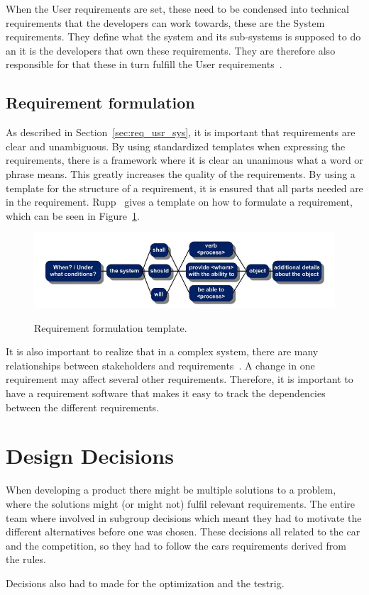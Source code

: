 When the User requirements are set, these need to be condensed into technical
requirements that the developers can work towards, these are the System
requirements. They define what the system and its sub-systems is supposed to do
an it is the developers that own these requirements. They are therefore also
responsible for that these in turn fulfill the User requirements~\cite{ibm_req}.

\subsection{Requirement formulation}
As described in Section~\ref{sec:req_usr_sys}, it is important that requirements
are clear and unambiguous. By using standardized templates when expressing the
requirements, there is a framework where it is clear an unanimous what a word or
phrase means.  This greatly increases the quality of the
requirements\cite{rupp2014}.  By using a template for the structure of a
requirement, it is ensured that all parts needed are in the requirement.
Rupp~\cite{rupp2014} gives a template on how to formulate a
requirement, which can be seen in Figure~\ref{fig:req_template}.
\begin{figure}[H]
    \centering\label{fig:req_template}
    \includegraphics[width=\textwidth]{./img/introduction_req_template.PNG}
    \caption{Requirement formulation template.}
\end{figure}
It is also important to realize that in a complex system, there are many
relationships between stakeholders and requirements~\cite{ibm_req}. A change in
one requirement may affect several other requirements. Therefore, it is
important to have a requirement software that makes it easy to track the
dependencies between the different requirements.


\section{Design Decisions}
When developing a product there might be multiple solutions to a problem, 
where the solutions might (or might not) fulfil relevant requirements. 
The entire team where involved in subgroup decisions which meant they had to motivate
the different alternatives before one was chosen. These decisions all related to the 
car and the competition, so they had to follow the cars requirements derived from the rules.

Decisions also had to made for the optimization and the testrig. 
